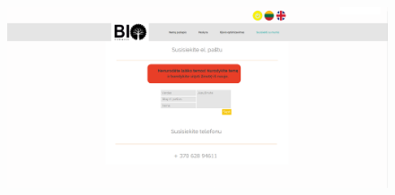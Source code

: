 \documentclass[a4paper,12pt]{article}
\begin{document}
\begin{figure}[!tph]
\hspace{-2cm}
\includegraphics[scale=0.5]{interfeisai/susisiekimasSuKlaida}
\label{fig:verticalcell}
\end{figure}

\clearpage
\end{document}
